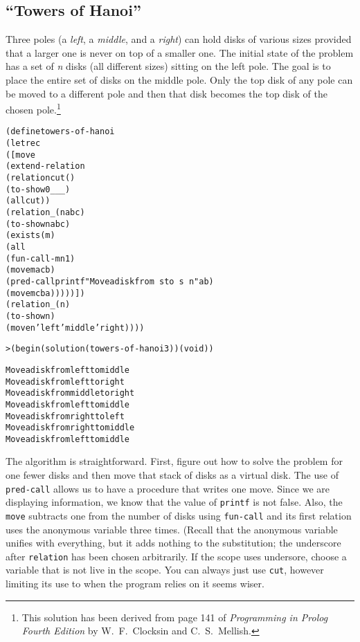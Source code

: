 \subsection{``Towers of Hanoi''}

Three poles (a \emph{left}, a \emph{middle}, and a \emph{right}) can hold
disks of various sizes provided that a larger one is never on top of a
smaller one.  The initial state of the problem has a set of \emph{n}
disks (all different sizes) sitting on the left pole.  The goal is to
place the entire set of disks on the middle pole.  Only the top disk
of any pole can be moved to a different pole and then that disk
becomes the top disk of the chosen pole.\footnote{This solution has been derived from
page 141 of \emph{Programming in Prolog Fourth Edition} by
W.\ F.\ Clocksin and C.\ S.\ Mellish.}
\newpage
\begin{alltt}
(define towers-of-hanoi
  (letrec
      ([move
         (extend-relation
           (relation cut ()
             (to-show 0 _ _ _)
             (all cut))
           (relation _ (n a b c)
             (to-show n a b c)
             (exists (m)
               (all
                 (fun-call - m n 1)
                 (move m a c b)
                 (pred-call printf "Move a disk from ~s to ~s~n" a b)
                 (move m c b a)))))])
    (relation _ (n)
      (to-show n)
      (move n 'left 'middle 'right))))
\end{alltt}

\begin{alltt}
> (begin (solution (towers-of-hanoi 3)) (void))

Move a disk from left to middle
Move a disk from left to right
Move a disk from middle to right
Move a disk from left to middle
Move a disk from right to left
Move a disk from right to middle
Move a disk from left to middle
\end{alltt}

The algorithm is straightforward. First, figure out how to solve the
problem for one fewer disks and then move that stack of disks as a
virtual disk.  The use of \texttt{pred-call} allows us to have a
procedure that writes one move.  Since we are displaying information,
we know that the value of \texttt{printf} is not false.  Also, the
\texttt{move} subtracts one from the number of disks using
\texttt{fun-call} and its first relation uses the anonymous variable
three times.  (Recall that the anonymous variable unifies with
everything, but it adds nothing to the substitution; the underscore
after \texttt{relation} has been chosen arbitrarily.  If the scope
uses undersore, choose a variable that is not live in the scope.  You
can always just use \texttt{cut}, however limiting its use to when the
program relies on it seems wiser.

